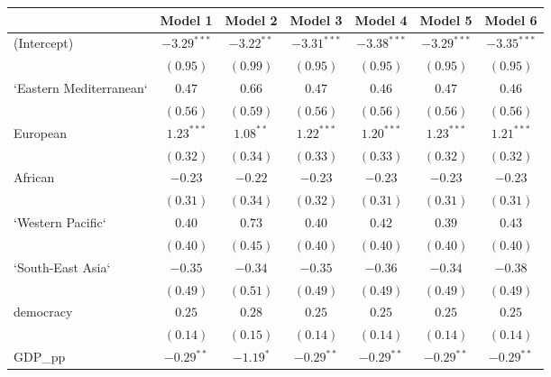 
\begin{table}[!h]
\begin{center}
\begin{tabular}{l c c c c c c }
\toprule
 & Model 1 & Model 2 & Model 3 & Model 4 & Model 5 & Model 6 \\
\midrule
(Intercept)             & $-3.29^{***}$ & $-3.22^{**}$ & $-3.31^{***}$ & $-3.38^{***}$ & $-3.29^{***}$ & $-3.35^{***}$ \\
                        & $(0.95)$      & $(0.99)$     & $(0.95)$      & $(0.95)$      & $(0.95)$      & $(0.95)$      \\
`Eastern Mediterranean` & $0.47$        & $0.66$       & $0.47$        & $0.46$        & $0.47$        & $0.46$        \\
                        & $(0.56)$      & $(0.59)$     & $(0.56)$      & $(0.56)$      & $(0.56)$      & $(0.56)$      \\
European                & $1.23^{***}$  & $1.08^{**}$  & $1.22^{***}$  & $1.20^{***}$  & $1.23^{***}$  & $1.21^{***}$  \\
                        & $(0.32)$      & $(0.34)$     & $(0.33)$      & $(0.33)$      & $(0.32)$      & $(0.32)$      \\
African                 & $-0.23$       & $-0.22$      & $-0.23$       & $-0.23$       & $-0.23$       & $-0.23$       \\
                        & $(0.31)$      & $(0.34)$     & $(0.32)$      & $(0.31)$      & $(0.31)$      & $(0.31)$      \\
`Western Pacific`       & $0.40$        & $0.73$       & $0.40$        & $0.42$        & $0.39$        & $0.43$        \\
                        & $(0.40)$      & $(0.45)$     & $(0.40)$      & $(0.40)$      & $(0.40)$      & $(0.40)$      \\
`South-East Asia`       & $-0.35$       & $-0.34$      & $-0.35$       & $-0.36$       & $-0.34$       & $-0.38$       \\
                        & $(0.49)$      & $(0.51)$     & $(0.49)$      & $(0.49)$      & $(0.49)$      & $(0.49)$      \\
democracy               & $0.25$        & $0.28$       & $0.25$        & $0.25$        & $0.25$        & $0.25$        \\
                        & $(0.14)$      & $(0.15)$     & $(0.14)$      & $(0.14)$      & $(0.14)$      & $(0.14)$      \\
GDP\_pp                 & $-0.29^{**}$  & $-1.19^{*}$  & $-0.29^{**}$  & $-0.29^{**}$  & $-0.29^{**}$  & $-0.29^{**}$  \\

\end{tabular}
\end{center}
\end{table}
